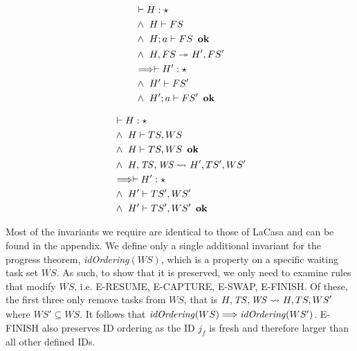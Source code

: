 \begin{theorem}
    \begin{alignat}{3}
    & \vdash H : \star\\
    &\wedge\ H \vdash FS\\
    &\wedge\ H; a \vdash FS\ \bn{ok}\\
    &\wedge\ \reducstack{}*[H']{}[FS']*\\
    &\Longrightarrow \vdash H' : \star\\
    &\wedge\ H' \vdash FS'\\
    &\wedge\ H'; a \vdash FS'\ \bn{ok}
    \end{alignat}
\end{theorem}

\begin{theorem}
    \begin{alignat}{3}
    & \vdash H : \star \label{pres-ts-prem-hstar}\\
    &\wedge\  H \vdash TS, WS \label{pres-ts-prem-tsws}\\
    &\wedge\  H \vdash TS, WS\ \bn{ok} \label{pres-ts-prem-tswsok}\\
    &\wedge\  \reductasks{}*[H']{}[TS', WS']* \label{pres-ts-prem-reduc}\\
    &\Longrightarrow \vdash H' : \star \label{pres-ts-concl-hstar}\\
    &\wedge\  H' \vdash TS', WS' \label{pres-ts-concl-tsws}\\
    &\wedge\  H' \vdash TS', WS'\ \bn{ok} \label{pres-ts-concl-tswsok}
    \end{alignat}
\end{theorem}

Most of the invariants we require are identical to those of LaCasa and can be found in the appendix. We define only a single additional invariant for the progress theorem, \textit{idOrdering}$(WS)$, which is a property on a specific waiting task set $WS$. As such, to show that it is preserved, we only need to examine rules that modify $WS$, i.e. E-RESUME, E-CAPTURE, E-SWAP, E-FINISH. Of these, the first three only remove tasks from $WS$, that is $\reductasks{}*{}[TS, WS']*$ where $WS' \subseteq WS$. It follows that $\mathop{\mathit{idOrdering}}(WS) \Longrightarrow \mathop{\mathit{idOrdering}}(WS')$. E-FINISH also preserves ID ordering as the ID $j_f$ is fresh and therefore larger than all other defined IDs. 

